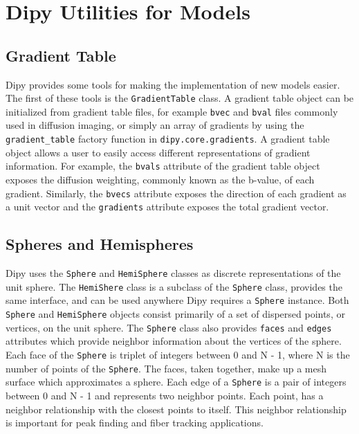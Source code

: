 \section{Dipy Utilities for Models}

\subsection{Gradient Table}
Dipy provides some tools for making the implementation of new models easier. The first of these tools is the \verb|GradientTable| class. A gradient table object can be initialized from gradient table files, for example \verb|bvec| and \verb|bval| files commonly used in diffusion imaging, or simply an array of gradients by using the \verb|gradient_table| factory function in \verb|dipy.core.gradients|. A gradient table object allows a user to easily access different representations of gradient information. For example, the \verb|bvals| attribute of the gradient table object exposes the diffusion weighting, commonly known as the b-value, of each gradient. Similarly, the \verb|bvecs| attribute exposes the direction of each gradient as a unit vector and the \verb|gradients| attribute exposes the total gradient vector.

\subsection{Spheres and Hemispheres}
Dipy uses the \verb|Sphere| and \verb|HemiSphere| classes as discrete representations of the unit sphere. The \verb|HemiShere| class is a subclass of the \verb|Sphere| class, provides the same interface, and can be used anywhere Dipy requires a \verb|Sphere| instance.  Both \verb|Sphere| and \verb|HemiSphere| objects consist primarily of a set of dispersed points, or vertices, on the unit sphere. The \verb|Sphere| class also provides \verb|faces| and \verb|edges| attributes which provide neighbor information about the vertices of the sphere. Each face of the \verb|Sphere| is triplet of integers between 0 and N - 1, where N is the number of points of the \verb|Sphere|. The faces, taken together, make up a mesh surface which approximates a sphere. Each edge of a \verb|Sphere| is a pair of integers between 0 and N - 1 and represents two neighbor points. Each point, has a neighbor relationship with the closest points to itself. This neighbor relationship is important for peak finding and fiber tracking applications.

